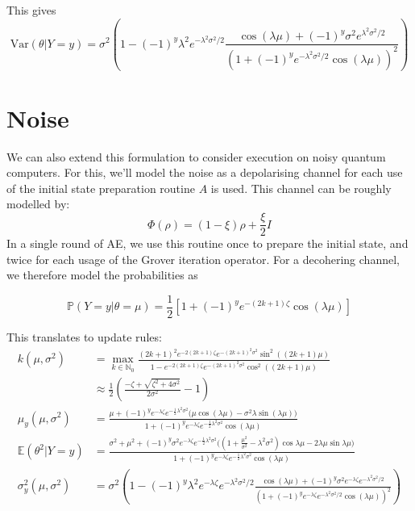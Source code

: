 \documentclass[]{report}
\begin{document}
This gives
\[
\text{Var}(\theta | Y = y) = \sigma^2 \left( 1 - (-1)^y \lambda^2 e^{- \lambda^2 \sigma^2 /2} \frac{\cos (\lambda \mu) + (-1)^y\sigma^2 e^{\lambda^2 \sigma^2 /2}}{(1 + (-1)^y e^{- \lambda^2 \sigma^2 / 2} \cos  ( \lambda \mu))^2}\right)
\]

\section{Noise}
We can also extend this formulation to consider execution on noisy quantum computers. For this, we'll model the noise as a depolarising channel for each use of the initial state preparation routine $A$ is used. 
This channel can be roughly modelled by:
\[
\Phi(\rho) = (1 - \xi) \rho + \frac{\xi}{2} I
\]
In a single round of AE, we use this routine once to prepare the initial state, and twice for each usage of the Grover iteration operator. For a decohering channel, we therefore model the probabilities as 

\[
\mathbb{P}(Y = y| \theta = \mu)  = \frac{1}{2}\left[1 + (-1)^y e^{- (2k +1) \zeta} \cos(\lambda \mu)\right]
\] 

This translates to update rules:
\begin{align*}
	k(\mu, \sigma^2)  &= \max_{k \in \mathbb{N}_0} \frac{(2k+1)^2 e^{-2 (2k+1) \zeta} e^{-(2k+1)^2\sigma^2} \sin^2((2k+1)\mu)}{1- e^{-2 (2k+1)\zeta }e^{-(2k+1)^2\sigma^2} \cos^2((2k+1)\mu)} \\
	& \approx \frac{1}{2}\left( \frac{- \zeta + \sqrt{\zeta^2 + 4\sigma^2}}{2\sigma^2} - 1\right) \\
	\mu_{y}(\mu, \sigma^2) &= \frac{\mu + (-1)^y e^{-\lambda \zeta} e^{-\frac{1}{2}\lambda^2\sigma^2}\big(\mu\cos(\lambda\mu) - \sigma^2\lambda \sin(\lambda\mu)\big)}{1+(-1)^y e^{-\lambda \zeta} e^{-\frac{1}{2}\lambda^2\sigma^2}\cos(\lambda\mu)} \\
	    \mathbb{E}(\theta^2 | Y=y) &= \frac{\sigma^2 + \mu^2+ (-1)^y \sigma^2 e^{-\lambda \zeta}e^{-\frac{1}{2}\lambda^2\sigma^2}\Big((1 + \frac{\mu^2}{\sigma^2} - \lambda^2\sigma^2)\cos{\lambda \mu} - 2\lambda \mu \sin{\lambda \mu}\Big)}{1+(-1)^ye^{-\lambda \zeta}e^{-\frac{1}{2}\lambda^2\sigma^2}\cos(\lambda\mu)} \\
	\sigma^2_{y}(\mu, \sigma^2) &= \sigma^2 \left( 1 - (-1)^y \lambda^2 e^{-\lambda \zeta} e^{- \lambda^2 \sigma^2 /2} \frac{\cos (\lambda \mu) + (-1)^y\sigma^2 e^{-\lambda \zeta} e^{- \lambda^2 \sigma^2 /2}}{(1 + (-1)^y e^{-\lambda \zeta} e^{- \lambda^2 \sigma^2 / 2} \cos  ( \lambda \mu))^2}\right)
\end{align*}
\end{document}
